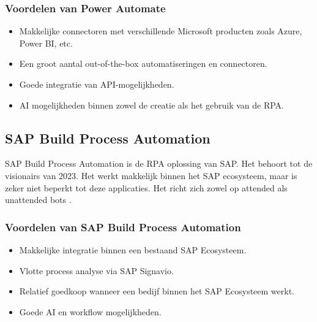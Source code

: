 \subsubsection{Voordelen van Power Automate}

\begin{itemize}
    \item Makkelijke connectoren met verschillende Microsoft producten zoals Azure, Power BI, etc.
    \item Een groot aantal out-of-the-box automatiseringen en connectoren.
    \item Goede integratie van API-mogelijkheden.
    \item AI mogelijkheden binnen zowel de creatie als het gebruik van de RPA.
\end{itemize}

\subsection{SAP Build Process Automation}

SAP Build Process Automation is de RPA oplossing van SAP. Het behoort tot de visionairs van 2023. Het werkt makkelijk binnen het SAP ecosysteem, maar is zeker niet beperkt tot deze applicaties. Het richt zich zowel op attended als unattended bots \autocite{GartnerSAPBPA2023}.

\subsubsection{Voordelen van SAP Build Process Automation}

\begin{itemize}
    \item Makkelijke integratie binnen een bestaand SAP Ecosysteem.
    \item Vlotte process analyse via SAP Signavio.
    \item Relatief goedkoop wanneer een bedijf binnen het SAP Ecosysteem werkt.
    \item Goede AI en workflow mogelijkheden.
\end{itemize}


